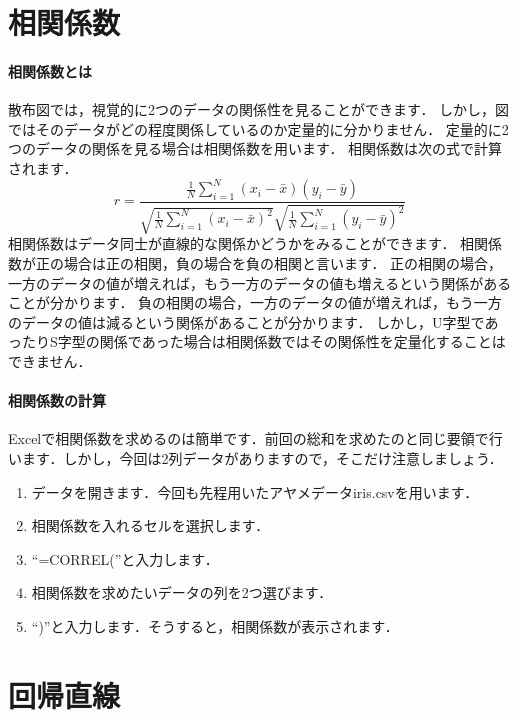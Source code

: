 \section{相関係数}

\paragraph{相関係数とは}

散布図では，視覚的に2つのデータの関係性を見ることができます．
しかし，図ではそのデータがどの程度関係しているのか定量的に分かりません．
定量的に2つのデータの関係を見る場合は相関係数を用います．
相関係数は次の式で計算されます．
\begin{equation}
    \label{eq:1}
    r = \frac{\frac{1}{N} \sum_{i=1}^N (x_i - \bar{x})(y_i - \bar{y})}{\sqrt{\frac{1}{N} \sum_{i=1}^N (x_i - \bar{x})^2} \sqrt{\frac{1}{N} \sum_{i=1}^N(y_i - \bar{y})^2}}
\end{equation}
相関係数はデータ同士が直線的な関係かどうかをみることができます．
相関係数が正の場合は正の相関，負の場合を負の相関と言います．
正の相関の場合，一方のデータの値が増えれば，もう一方のデータの値も増えるという関係があることが分かります．
負の相関の場合，一方のデータの値が増えれば，もう一方のデータの値は減るという関係があることが分かります．
しかし，U字型であったりS字型の関係であった場合は相関係数ではその関係性を定量化することはできません．


\paragraph{相関係数の計算}

Excelで相関係数を求めるのは簡単です．前回の総和を求めたのと同じ要領で行います．しかし，今回は2列データがありますので，そこだけ注意しましょう．

\begin{enumerate}
    \item データを開きます．今回も先程用いたアヤメデータiris.csvを用います．
    \item 相関係数を入れるセルを選択します．
    \item ``=CORREL(''と入力します．
    \item 相関係数を求めたいデータの列を2つ選びます．
    \item ``)''と入力します．そうすると，相関係数が表示されます．
\end{enumerate}

\section{回帰直線}

